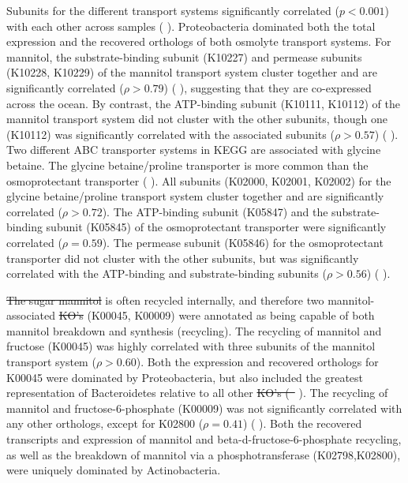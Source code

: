 \documentclass[utf8]{frontiersSCNS} %
\providecommand{\DIFaddtex}[1]{{\protect\color{blue}\uwave{#1}}} %
\providecommand{\DIFdeltex}[1]{{\protect\color{red}\sout{#1}}}                      %
\providecommand{\DIFaddbegin}{} %
\providecommand{\DIFaddend}{} %
\providecommand{\DIFdelbegin}{} %
\providecommand{\DIFdelend}{} %
\providecommand{\DIFadd}[1]{\texorpdfstring{\DIFaddtex{#1}}{#1}} %
\providecommand{\DIFdel}[1]{\texorpdfstring{\DIFdeltex{#1}}{}} %
\begin{document}
Subunits for the different transport systems significantly correlated ($p<0.001$) with each other across samples ( \DIFaddbegin \DIFadd{A}\DIFaddend ). Proteobacteria dominated both the total expression and the recovered orthologs of both osmolyte transport systems. For mannitol, the substrate-binding subunit (K10227) and permease subunits (K10228, K10229) of the mannitol transport system cluster together and are significantly correlated ($\rho > 0.79$)  ( \DIFaddbegin \DIFadd{A}\DIFaddend ), suggesting that they are co-expressed across the ocean. By contrast, the ATP-binding subunit (K10111, K10112) of the mannitol transport system did not cluster with the other subunits, though one (K10112) was significantly correlated with the associated subunits ($\rho >0.57$) ( \DIFaddbegin \DIFadd{A}\DIFaddend ). Two different ABC transporter systems in KEGG are associated with glycine betaine. The glycine betaine/proline transporter is more common than the osmoprotectant transporter ( \DIFaddbegin \DIFadd{A}\DIFaddend ). All subunits (K02000, K02001, K02002) for the glycine betaine/proline transport system cluster together and are significantly correlated ($\rho >0.72$). The ATP-binding subunit (K05847) and the substrate-binding subunit (K05845) of the osmoprotectant transporter were significantly correlated ($\rho=0.59$). The permease subunit (K05846) for the osmoprotectant transporter did not cluster with the other subunits, but was significantly correlated with the ATP-binding and substrate-binding subunits ($\rho>0.56$) ( \DIFaddbegin \DIFadd{A}\DIFaddend ). 

\DIFdelbegin \DIFdel{The sugar mannitol }\DIFdelend \DIFaddbegin \DIFadd{Mannitol }\DIFaddend is often recycled internally, and therefore two mannitol-associated \DIFdelbegin \DIFdel{KO's }\DIFdelend \DIFaddbegin \DIFadd{KOs }\DIFaddend (K00045, K00009) were annotated as being capable of both mannitol breakdown and synthesis (recycling). The recycling of mannitol and fructose (K00045) was highly correlated with three subunits of the mannitol transport system ($\rho > 0.60$). Both the expression and recovered orthologs for K00045 were dominated by Proteobacteria, but also included the greatest representation of Bacteroidetes relative to all other \DIFdelbegin \DIFdel{KO's (\mbox{%
 }%
}\DIFdelend \DIFaddbegin \DIFadd{KOs (\mbox{%
\Cref{fig:tarabact} }%
A}\DIFaddend ). The recycling of mannitol and fructose-6-phosphate (K00009) was not significantly correlated with any other orthologs, except for K02800 ($\rho = 0.41$) ( \DIFaddbegin \DIFadd{A}\DIFaddend ). Both the recovered transcripts and expression of mannitol and beta-d-fructose-6-phosphate recycling, as well as the breakdown of mannitol via a phosphotransferase (K02798,K02800), were uniquely dominated by Actinobacteria.
\DIFdelbegin %
\end{document}
